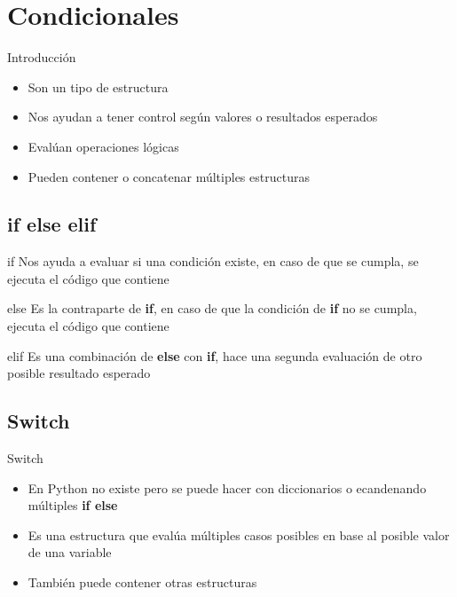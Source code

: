 \documentclass{beamer}
\begin{document}
\section{Condicionales}

\begin{frame}{Introducci\'on}
    \begin{itemize}
        \item Son un tipo de estructura
        \item Nos ayudan a tener control seg\'un valores o resultados esperados
        \item Eval\'uan operaciones l\'ogicas
        \item Pueden contener o concatenar m\'ultiples estructuras
    \end{itemize}
\end{frame}

\subsection{if else elif}

\begin{frame}{if}
    Nos ayuda a evaluar si una condici\'on existe, en caso de que se cumpla, se ejecuta el c\'odigo que contiene
\end{frame}

\begin{frame}{else}
    Es la contraparte de \textbf{if}, en caso de que la condici\'on de \textbf{if} no se cumpla, ejecuta el c\'odigo que contiene
\end{frame}

\begin{frame}{elif}
    Es una combinaci\'on de \textbf{else} con \textbf{if}, hace una segunda evaluaci\'on de otro posible resultado esperado
\end{frame}

\subsection{Switch}

\begin{frame}{Switch}
    \begin{itemize}
        \item En Python no existe pero se puede hacer con diccionarios o ecandenando m\'ultiples \textbf{if else}
        \item Es una estructura que eval\'ua m\'ultiples casos posibles en base al posible valor de una variable
        \item Tambi\'en puede contener otras estructuras
    \end{itemize}
\end{frame}
\end{document}
